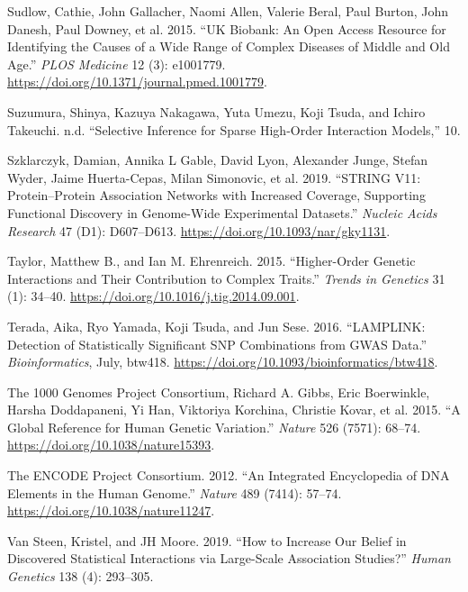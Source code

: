 \documentclass[
  11pt,
]{env/yjiao}
\newlength{\cslhangindent}
\newenvironment{cslreferences}%
  {\setlength{\parindent}{0pt}%
  \everypar{\setlength{\hangindent}{\cslhangindent}}\ignorespaces}%
  {\par}
\begin{document}
\begin{cslreferences}
\leavevmode\hypertarget{ref-sudlow_uk_2015}{}%
Sudlow, Cathie, John Gallacher, Naomi Allen, Valerie Beral, Paul Burton, John Danesh, Paul Downey, et al. 2015. ``UK Biobank: An Open Access Resource for Identifying the Causes of a Wide Range of Complex Diseases of Middle and Old Age.'' \emph{PLOS Medicine} 12 (3): e1001779. \url{https://doi.org/10.1371/journal.pmed.1001779}.

\leavevmode\hypertarget{ref-suzumura_selective_nodate}{}%
Suzumura, Shinya, Kazuya Nakagawa, Yuta Umezu, Koji Tsuda, and Ichiro Takeuchi. n.d. ``Selective Inference for Sparse High-Order Interaction Models,'' 10.

\leavevmode\hypertarget{ref-szklarczyk_string_2019}{}%
Szklarczyk, Damian, Annika L Gable, David Lyon, Alexander Junge, Stefan Wyder, Jaime Huerta-Cepas, Milan Simonovic, et al. 2019. ``STRING V11: Protein--Protein Association Networks with Increased Coverage, Supporting Functional Discovery in Genome-Wide Experimental Datasets.'' \emph{Nucleic Acids Research} 47 (D1): D607--D613. \url{https://doi.org/10.1093/nar/gky1131}.

\leavevmode\hypertarget{ref-taylor_higher-order_2015}{}%
Taylor, Matthew B., and Ian M. Ehrenreich. 2015. ``Higher-Order Genetic Interactions and Their Contribution to Complex Traits.'' \emph{Trends in Genetics} 31 (1): 34--40. \url{https://doi.org/10.1016/j.tig.2014.09.001}.

\leavevmode\hypertarget{ref-terada_lamplink_2016}{}%
Terada, Aika, Ryo Yamada, Koji Tsuda, and Jun Sese. 2016. ``LAMPLINK: Detection of Statistically Significant SNP Combinations from GWAS Data.'' \emph{Bioinformatics}, July, btw418. \url{https://doi.org/10.1093/bioinformatics/btw418}.

\leavevmode\hypertarget{ref-the_1000_genomes_project_consortium_global_2015}{}%
The 1000 Genomes Project Consortium, Richard A. Gibbs, Eric Boerwinkle, Harsha Doddapaneni, Yi Han, Viktoriya Korchina, Christie Kovar, et al. 2015. ``A Global Reference for Human Genetic Variation.'' \emph{Nature} 526 (7571): 68--74. \url{https://doi.org/10.1038/nature15393}.

\leavevmode\hypertarget{ref-the_encode_project_consortium_integrated_2012}{}%
The ENCODE Project Consortium. 2012. ``An Integrated Encyclopedia of DNA Elements in the Human Genome.'' \emph{Nature} 489 (7414): 57--74. \url{https://doi.org/10.1038/nature11247}.

\leavevmode\hypertarget{ref-van2019increase}{}%
Van Steen, Kristel, and JH Moore. 2019. ``How to Increase Our Belief in Discovered Statistical Interactions via Large-Scale Association Studies?'' \emph{Human Genetics} 138 (4): 293--305.


\end{cslreferences}
\end{document}

